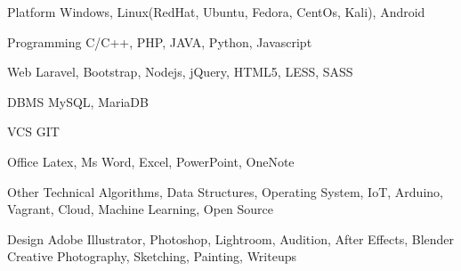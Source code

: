 

\begin{cvskills}

  \cvskill
	{Platform} %
	{Windows, Linux(RedHat, Ubuntu, Fedora, CentOs, Kali), Android} %

  \cvskill
    {Programming} %
    {C/C++, PHP, JAVA, Python, Javascript} %

  \cvskill
    {Web} %
    {Laravel, Bootstrap, Nodejs, jQuery, HTML5, LESS, SASS} %

  \cvskill
    {DBMS} %
    {MySQL, MariaDB} %

  \cvskill
	{VCS} %
	{GIT} %
	
  \cvskill
	{Office} %
	{Latex, Ms Word, Excel, PowerPoint, OneNote } %
	
  \cvskill
	{Other Technical} %
	{Algorithms, Data Structures, Operating System, IoT, Arduino, Vagrant, Cloud, Machine Learning, Open Source} %
	
  \cvskill
	{Design} %
	{Adobe Illustrator, Photoshop, Lightroom, Audition, After Effects, Blender} %
  \cvskill
	{Creative} %
	{Photography, Sketching, Painting, Writeups} %
\end{cvskills}
